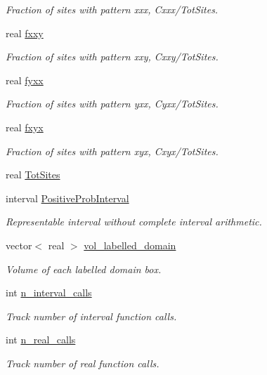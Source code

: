 \begin{DoxyCompactItemize}
\begin{DoxyCompactList}\small\item\em \-Fraction of sites with pattern xxx, \-Cxxx/\-Tot\-Sites. \end{DoxyCompactList}\item 
real \hyperlink{classFCFN3_a28619051be14083932e8c9f8018543d5}{fxxy}
\begin{DoxyCompactList}\small\item\em \-Fraction of sites with pattern xxy, \-Cxxy/\-Tot\-Sites. \end{DoxyCompactList}\item 
real \hyperlink{classFCFN3_af6590c09108db59f2d7116837fb68917}{fyxx}
\begin{DoxyCompactList}\small\item\em \-Fraction of sites with pattern yxx, \-Cyxx/\-Tot\-Sites. \end{DoxyCompactList}\item 
real \hyperlink{classFCFN3_a59030dc1b324e8dd4f236b97d78d69cd}{fxyx}
\begin{DoxyCompactList}\small\item\em \-Fraction of sites with pattern xyx, \-Cxyx/\-Tot\-Sites. \end{DoxyCompactList}\item 
real \hyperlink{classFCFN3_ac61db05a36bdc21a29f38afed405c188}{\-Tot\-Sites}
\item 
interval \hyperlink{classFCFN3_a53e77ef0b53f0fea50abd6e87f8a1c00}{\-Positive\-Prob\-Interval}
\begin{DoxyCompactList}\small\item\em \-Representable interval without complete interval arithmetic. \end{DoxyCompactList}\item 
vector$<$ real $>$ \hyperlink{classFCFN3_a50eac3a5d427bffc05f729ff3375a0ca}{vol\-\_\-labelled\-\_\-domain}
\begin{DoxyCompactList}\small\item\em \-Volume of each labelled domain box. \end{DoxyCompactList}\item 
int \hyperlink{classFCFN3_ac37ffd255223c75b83ea8805c9ca314d}{n\-\_\-interval\-\_\-calls}
\begin{DoxyCompactList}\small\item\em \-Track number of interval function calls. \end{DoxyCompactList}\item 
int \hyperlink{classFCFN3_a6af9c2e333d52639535dc61516f8f984}{n\-\_\-real\-\_\-calls}
\begin{DoxyCompactList}\small\item\em \-Track number of real function calls. \end{DoxyCompactList}\end{DoxyCompactItemize}


